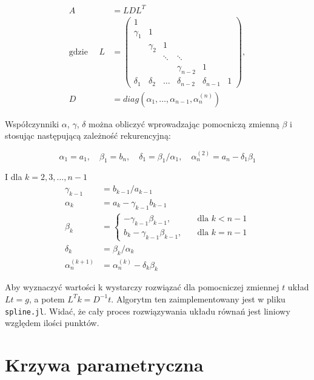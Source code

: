 \documentclass[11pt,wide]{mwart}
\begin{document}
\begin{align}
	A &= LDL^T \\
	\text{gdzie } \quad L &= 
	\left(\begin{matrix}
		1 			&			&			&				&				&\\
		\gamma_1 	& 1			&			&				&				&\\
					& \gamma_2	&	1		&				&				&\\
					&			& \ddots	& \ddots		&				&\\
					&			&			& \gamma_{n-2}	& 1				&\\
		\delta_1	& \delta_2	& \ldots	& \delta_{n-2}	& \delta_{n-1} 	& 1
	\end{matrix}\right), \\
	D &= diag(\alpha_1, \ldots, \alpha_{n-1}, \alpha_{n}^{(n)})
\end{align}

Współczynniki $ \alpha $, $ \gamma $, $ \delta $ można obliczyć wprowadzając pomocniczą zmienną $ \beta $ i stosując następującą zależność rekurencyjną:

\begin{equation}
	\alpha_1 = a_1, \quad \beta_1 = b_n, \quad \delta_1 = \beta_1 / \alpha_1, \quad \alpha_n^{(2)} = a_n - \delta_1\beta_1
\end{equation}

I dla $ k = 2, 3, \ldots , n-1 $
\begin{align}
	\gamma_{k-1} &= b_{k-1} / a_{k-1} \\
	\alpha_k &= a_k - \gamma_{k-1}b_{k-1} \\
	\beta_k &= 
		\begin{cases}
			- \gamma_{k-1}\beta_{k-1}, 		&\quad \text{dla } k < n-1 \\
			b_k - \gamma_{k-1}\beta_{k-1}, 	&\quad \text{dla } k = n-1
		\end{cases} \\
	\delta_k &= \beta_k / \alpha_k \\
	\alpha_n^{(k+1)} &= \alpha_n^{(k)} - \delta_k\beta_k
\end{align}

Aby wyznaczyć wartości k wystarczy rozwiązać dla pomocniczej zmiennej $ t $ układ $ Lt = g $, a potem $ L^T k = D^{-1}t$. Algorytm ten zaimplementowany jest w pliku \texttt{spline.jl}. Widać, że cały proces rozwiązywania układu równań jest liniowy względem ilości punktów.

\section{Krzywa parametryczna}
\end{document}
